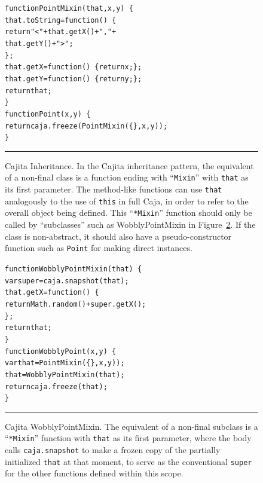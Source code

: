 \documentclass[letterpaper,twocolumn,10pt]{article}
\newcommand{\code}[1]{{\tt {#1}}}              %
\begin{document}
\begin{figure}[t!]
\begin{alltt}
function PointMixin(that, x, y)\ \{
  that.toString = function()\ \{ 
    return "<" + that.getX() + "," + 
                 that.getY() + ">"; 
  \};
  that.getX = function()\ \{ return x; \};
  that.getY = function()\ \{ return y; \};
  return that;
\}
function Point(x, y)\ \{
  return caja.freeze(PointMixin(\{\}, x, y));
\}
\end{alltt}

\caption[Cajita Inheritance.]{Cajita Inheritance. In the Cajita inheritance 
pattern, the equivalent of a non-final class is a function ending with 
``\code{Mixin}'' with \code{that} as its first parameter. The method-like 
functions can use \code{that} analogously to the use of \code{this} in full 
Caja, in order to refer to the overall object being defined. This 
``\code{*Mixin}'' function should only be called by ``subclasses'' such as 
WobblyPointMixin in Figure~\ref{fig:cajita-super-wobbly-point}. If the class is non-abstract, it should also have a 
pseudo-constructor function such as \code{Point} for making direct 
instances. \\ } \hrule
\label{fig:cajita-super-point}
\end{figure}

\begin{figure}[t!]
\begin{alltt}
function WobblyPointMixin(that)\ \{
  var super = caja.snapshot(that);
  that.getX = function()\ \{ 
    return Math.random() + super.getX(); 
  \};
  return that;
\}
function WobblyPoint(x, y)\ \{
  var that = PointMixin(\{\}, x, y));
  that = WobblyPointMixin(that);
  return caja.freeze(that);
\}
\end{alltt}

\caption[Cajita WobblyPointMixin.]{Cajita WobblyPointMixin. The equivalent of 
a non-final subclass is a ``\code{*Mixin}'' function with \code{that} as its 
first parameter, where the body calls \code{caja.snapshot} to make a frozen 
copy of the partially initialized \code{that} at that moment, to serve as the 
conventional \code{super} for the other functions defined within this scope. 
\\ } \hrule
\label{fig:cajita-super-wobbly-point} 
\end{figure}
\end{document}
